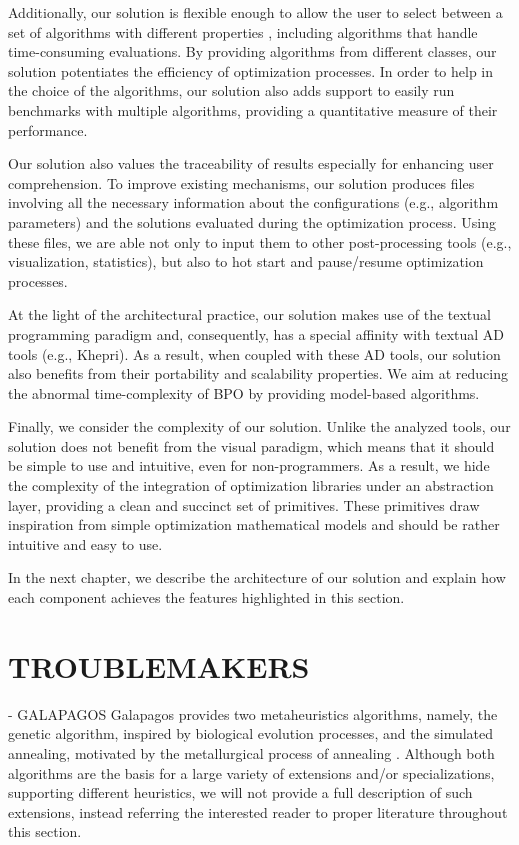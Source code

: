 Additionally, our solution is flexible enough to allow the user to select between a set of algorithms with different properties \cite{Wolpert1997NFLT}, including algorithms that handle time-consuming evaluations. By providing algorithms from different classes, our solution potentiates the efficiency of optimization processes. In order to help in the choice of the algorithms, our solution also adds support to easily run benchmarks with multiple algorithms, providing a quantitative measure of their performance. 

Our solution also values the traceability of results especially for enhancing user comprehension. To improve existing mechanisms, our solution produces files involving all the necessary information about the configurations (e.g., algorithm parameters) and the solutions evaluated during the optimization process. Using these files, we are able not only to input them to other post-processing tools (e.g., visualization, statistics), but also to hot start and pause/resume optimization processes.

At the light of the architectural practice, our solution makes use of the textual programming paradigm and, consequently, has a special affinity with textual \ac{AD} tools (e.g., Khepri). As a result, when coupled with these \ac{AD} tools, our solution also benefits from their portability and scalability properties. We aim at reducing the abnormal time-complexity of \ac{BPO} by providing model-based algorithms. 

Finally, we consider the complexity of our solution. Unlike the analyzed tools, our solution does not benefit from the visual paradigm, which means that it should be simple to use and intuitive, even for non-programmers. As a result, we hide the complexity of the integration of optimization libraries under an abstraction layer, providing a clean and succinct set of primitives. These primitives draw inspiration from simple optimization mathematical models and should be rather intuitive and easy to use. 

In the next chapter, we describe the architecture of our solution and explain how each component achieves the features highlighted in this section.


\section{TROUBLEMAKERS}
- GALAPAGOS
Galapagos provides two metaheuristics algorithms, namely, the genetic algorithm, inspired by biological evolution processes, and the simulated annealing, motivated by the metallurgical process of annealing \cite{Brownlee2011}. Although both algorithms are the basis for a large variety of extensions and/or specializations, supporting different heuristics, we will not provide a full description of such extensions, instead referring the interested reader to proper literature throughout this section. 

